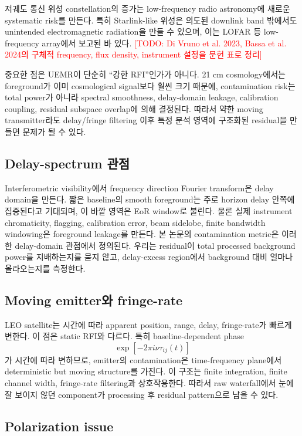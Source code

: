 \documentclass[11pt,a4paper]{article}
\newcommand{\todo}[1]{\textcolor{red}{[TODO: #1]}}
\begin{document}
저궤도 통신 위성 constellation의 증가는 low-frequency radio astronomy에 새로운 systematic risk를 만든다.
특히 Starlink-like 위성은 의도된 downlink band 밖에서도 unintended electromagnetic radiation을 만들 수 있으며, 이는 LOFAR 등 low-frequency array에서 보고된 바 있다.
\todo{Di Vruno et al. 2023, Bassa et al. 2024의 구체적 frequency, flux density, instrument 설정을 문헌 표로 정리}

중요한 점은 UEMR이 단순히 ``강한 RFI''인가가 아니다.
21 cm cosmology에서는 foreground가 이미 cosmological signal보다 훨씬 크기 때문에, contamination risk는 total power가 아니라 spectral smoothness, delay-domain leakage, calibration coupling, residual subspace overlap에 의해 결정된다.
따라서 약한 moving transmitter라도 delay/fringe filtering 이후 특정 분석 영역에 구조화된 residual을 만들면 문제가 될 수 있다.

\subsection{Delay-spectrum 관점}

Interferometric visibility에서 frequency direction Fourier transform은 delay domain을 만든다.
짧은 baseline의 smooth foreground는 주로 horizon delay 안쪽에 집중된다고 기대되며, 이 바깥 영역은 EoR window로 불린다.
물론 실제 instrument chromaticity, flagging, calibration error, beam sidelobe, finite bandwidth windowing은 foreground leakage를 만든다.
본 논문의 contamination metric은 이러한 delay-domain 관점에서 정의된다.
우리는 residual이 total processed background power를 지배하는지를 묻지 않고, delay-excess region에서 background 대비 얼마나 올라오는지를 측정한다.

\subsection{Moving emitter와 fringe-rate}

LEO satellite는 시간에 따라 apparent position, range, delay, fringe-rate가 빠르게 변한다.
이 점은 static RFI와 다르다.
특히 baseline-dependent phase
\[
  \exp[-2\pi i\nu\tau_{ij}(t)]
\]
가 시간에 따라 변하므로, emitter의 contamination은 time-frequency plane에서 deterministic but moving structure를 가진다.
이 구조는 finite integration, finite channel width, fringe-rate filtering과 상호작용한다.
따라서 raw waterfall에서 눈에 잘 보이지 않던 component가 processing 후 residual pattern으로 남을 수 있다.

\subsection{Polarization issue}
\end{document}
